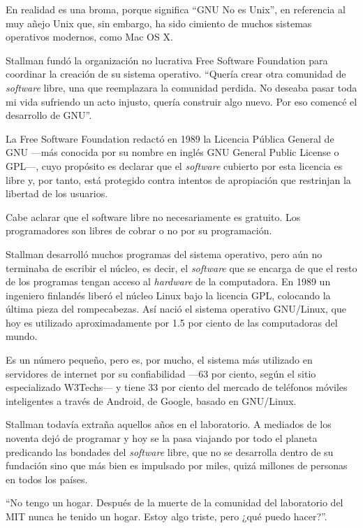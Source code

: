 \documentclass[oneside,twocolumn]{article}
\begin{document}
En realidad es una broma, porque significa ``GNU No es Unix'', en referencia al muy añejo Unix que, 
sin embargo, ha sido cimiento de muchos sistemas operativos modernos, como Mac OS X.

Stallman fundó la organización no lucrativa Free Software Foundation para coordinar la creación de 
su sistema operativo. ``Quería crear otra comunidad de \emph{software} libre, una que reemplazara la 
comunidad perdida. No deseaba pasar toda mi vida sufriendo un acto injusto, quería construir algo nuevo. 
Por eso comencé el desarrollo de GNU''.

La Free Software Foundation redactó en 1989 la Licencia Pública General de GNU ---más conocida por su 
nombre en inglés GNU General Public License o GPL---, cuyo propósito es declarar que el \emph{software}
cubierto por esta licencia es libre y, por tanto, está protegido contra intentos de apropiación que 
restrinjan la libertad de los usuarios.

Cabe aclarar que el software libre no necesariamente es gratuito. Los programadores son libres de 
cobrar o no por su programación.

Stallman desarrolló muchos programas del sistema operativo, pero aún no terminaba de escribir el 
núcleo, es decir, el \emph{software} que se encarga de que el resto de los programas tengan acceso 
al \emph{hardware} de la computadora. En 1989 un ingeniero finlandés liberó el núcleo Linux bajo la 
licencia GPL, colocando la última pieza del rompecabezas. Así nació el sistema operativo GNU/Linux, que 
hoy es utilizado aproximadamente por 1.5 por ciento de las computadoras del mundo.

Es un número pequeño, pero es, por mucho, el sistema más utilizado en servidores de internet por su 
confiabilidad ---63 por ciento, según el sitio especializado W3Techs--- y tiene 33 por ciento del mercado de 
teléfonos móviles inteligentes a través de Android, de Google, basado en GNU/Linux.

Stallman todavía extraña aquellos años en el laboratorio. A mediados de los noventa dejó de programar 
y hoy se la pasa viajando por todo el planeta predicando las bondades del \emph{software} libre, que 
no se desarrolla dentro de su fundación sino que más bien es impulsado por miles, quizá millones de 
personas en todos los países.

``No tengo un hogar. Después de la muerte de la comunidad del laboratorio del MIT nunca he tenido un 
hogar. Estoy algo triste, pero ¿qué puedo hacer?''.
\end{document}
